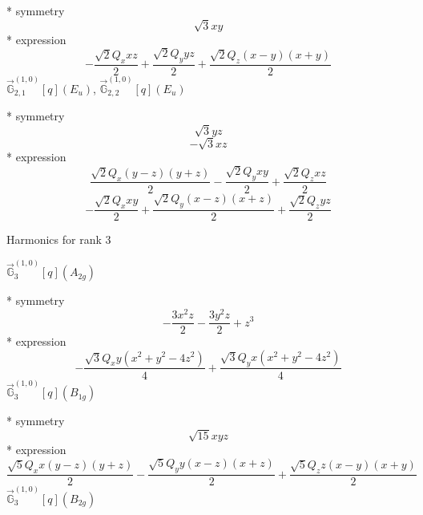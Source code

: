 \documentclass[fleqn,8pt]{jsarticle}
\begin{document}
\noindent\quad ** symmetry
\begin{dmath*}
\sqrt{3} x y
\end{dmath*}
\noindent\quad ** expression
\begin{dmath*}
- \frac{\sqrt{2} Q_{x} x z}{2} + \frac{\sqrt{2} Q_{y} y z}{2} + \frac{\sqrt{2} Q_{z} \left(x - y\right) \left(x + y\right)}{2}
\end{dmath*}
\noindent\quad $\vec{\mathbb{G}}_{2,1}^{(1,0)}[q](E_{u})$, $\vec{\mathbb{G}}_{2,2}^{(1,0)}[q](E_{u})$

\noindent\quad ** symmetry
\begin{dmath*}
\sqrt{3} y z
\end{dmath*}
\begin{dmath*}
- \sqrt{3} x z
\end{dmath*}
\noindent\quad ** expression
\begin{dmath*}
\frac{\sqrt{2} Q_{x} \left(y - z\right) \left(y + z\right)}{2} - \frac{\sqrt{2} Q_{y} x y}{2} + \frac{\sqrt{2} Q_{z} x z}{2}
\end{dmath*}
\begin{dmath*}
- \frac{\sqrt{2} Q_{x} x y}{2} + \frac{\sqrt{2} Q_{y} \left(x - z\right) \left(x + z\right)}{2} + \frac{\sqrt{2} Q_{z} y z}{2}
\end{dmath*}

\noindent * Harmonics for rank 3

\noindent\quad $\vec{\mathbb{G}}_{3}^{(1,0)}[q](A_{2g})$

\noindent\quad ** symmetry
\begin{dmath*}
- \frac{3 x^{2} z}{2} - \frac{3 y^{2} z}{2} + z^{3}
\end{dmath*}
\noindent\quad ** expression
\begin{dmath*}
- \frac{\sqrt{3} Q_{x} y \left(x^{2} + y^{2} - 4 z^{2}\right)}{4} + \frac{\sqrt{3} Q_{y} x \left(x^{2} + y^{2} - 4 z^{2}\right)}{4}
\end{dmath*}
\noindent\quad $\vec{\mathbb{G}}_{3}^{(1,0)}[q](B_{1g})$

\noindent\quad ** symmetry
\begin{dmath*}
\sqrt{15} x y z
\end{dmath*}
\noindent\quad ** expression
\begin{dmath*}
\frac{\sqrt{5} Q_{x} x \left(y - z\right) \left(y + z\right)}{2} - \frac{\sqrt{5} Q_{y} y \left(x - z\right) \left(x + z\right)}{2} + \frac{\sqrt{5} Q_{z} z \left(x - y\right) \left(x + y\right)}{2}
\end{dmath*}
\noindent\quad $\vec{\mathbb{G}}_{3}^{(1,0)}[q](B_{2g})$
\end{document}
